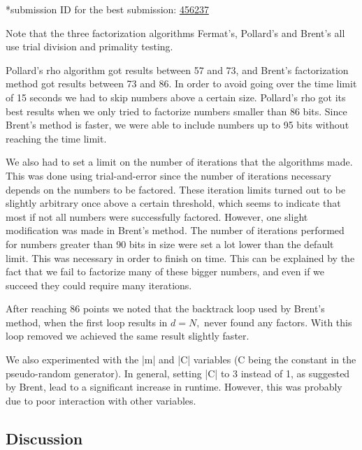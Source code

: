 \documentclass[paper=a4, fontsize=11pt,numbers=endperiod]{scrartcl} %
\numberwithin{equation}{section} %
\numberwithin{figure}{section} %
\numberwithin{table}{section} %
\begin{document}
    \footnotesize{*submission ID for the best submission: \href{https://kth.kattis.scrool.se/submission?id=456237}{456237}
    \normalsize

Note that the three factorization algorithms Fermat's, Pollard's and Brent's all use trial division and primality testing.

Pollard's rho algorithm got results between 57 and 73, and Brent's factorization method got results between 73 and 86.
In order to avoid going over the time limit of 15 seconds we had to skip numbers above a certain size.
Pollard's rho got its best results when we only tried to factorize numbers smaller than 86 bits.
Since Brent's method is faster, we were able to include numbers up to 95 bits without reaching the time limit.

We also had to set a limit on the number of iterations that the algorithms made.
This was done using trial-and-error since the number of iterations necessary depends on the numbers to be factored.
These iteration limits turned out to be slightly arbitrary once above a certain threshold, which seems to indicate that most if not all numbers were successfully factored.
However, one slight modification was made in Brent's method.
The number of iterations performed for numbers greater than 90 bits in size were set a lot lower than the default limit. This was necessary in order to finish on time. 
This can be explained by the fact that we fail to factorize many of these bigger numbers, 
and even if we succeed they could require many iterations.

After reaching 86 points we noted that the backtrack loop used by Brent's method, when the first loop results in $d = N,$ never found any factors. With this loop removed we achieved the same result slightly faster.

We also experimented with the |m| and |C| variables (C being the constant in the pseudo-random generator).
In general, setting |C| to 3 instead of 1, as suggested by Brent, lead to a significant increase in runtime. However, this was probably due to poor interaction with other variables.



\subsection{Discussion}

}
\end{document}
